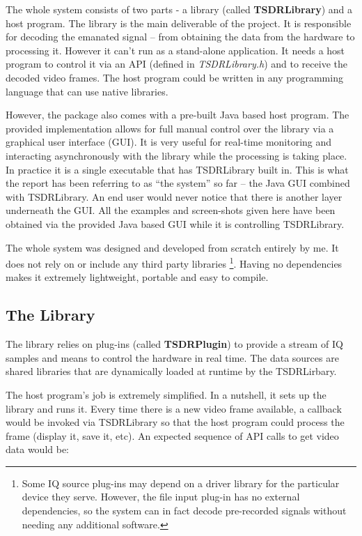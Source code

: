 \documentclass[a4paper,12pt,twoside,openright]{report}
\begin{document}
The whole system consists of two parts - a library (called \textbf{TSDRLibrary}) and a host program. The library is the main deliverable of the project. It is responsible for decoding the emanated signal -- from obtaining the data from the hardware to processing it. However it can't run as a stand-alone application. It needs a host program to control it via an API (defined in \textit{TSDRLibrary.h}) and to receive the decoded video frames. The host program could be written in any programming language that can use native libraries.

However, the package also comes with a pre-built Java based host program. The provided implementation allows for full manual control over the library via a graphical user interface (GUI). It is very useful for real-time monitoring and interacting asynchronously with the library while the processing is taking place. In practice it is a single executable that has TSDRLibrary built in. This is what the report has been referring to as ``the system'' so far -- the Java GUI combined with TSDRLibrary. An end user would never notice that there is another layer underneath the GUI. All the examples and screen-shots given here have been obtained via the provided Java based GUI while it is controlling TSDRLibrary.

The whole system was designed and developed from scratch entirely by me. It does not rely on or include any third party libraries \footnote{Some IQ source plug-ins may depend on a driver library for the particular device they serve. However, the file input plug-in has no external dependencies, so the system can in fact decode pre-recorded signals without needing any additional software.}. Having no dependencies makes it extremely lightweight, portable and easy to compile. 

\subsection{The Library}

The library relies on plug-ins (called \textbf{TSDRPlugin}) to provide a stream of IQ samples and means to control the hardware in real time. The data sources are shared libraries that are dynamically loaded at runtime by the TSDRLirbary.

The host program's job is extremely simplified. In a nutshell, it sets up the library and runs it. Every time there is a new video frame available, a callback would be invoked via TSDRLibrary so that the host program could process the frame (display it, save it, etc). An expected sequence of API calls to get video data would be:
\end{document}
